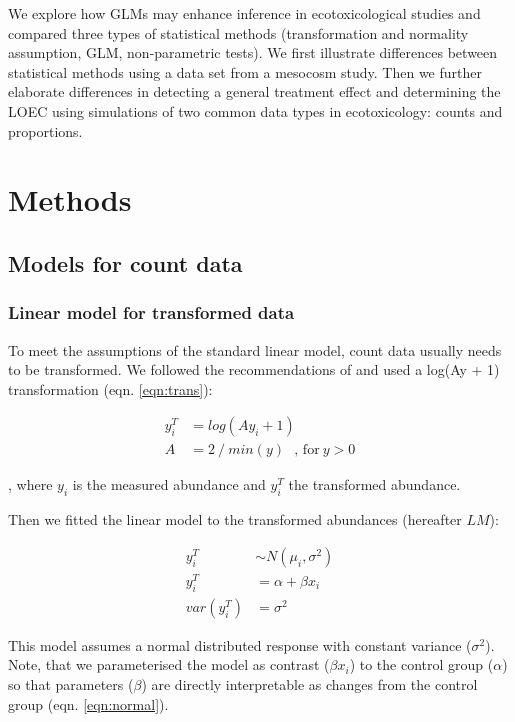 \documentclass{scrartcl}
\begin{document}
We explore how GLMs may enhance inference in ecotoxicological studies and compared three types of statistical methods (transformation and normality assumption, GLM, non-parametric tests).
We first illustrate differences between statistical methods using a data set from a mesocosm study.
Then we further elaborate differences in detecting a general treatment effect and determining the LOEC using simulations of two common data types in ecotoxicology: counts and proportions. 



\section{Methods}
\label{sec:methods}

\subsection{Models for count data}
\subsubsection{Linear model for transformed data}
To meet the assumptions of the standard linear model, count data usually needs to be transformed. 
We followed the recommendations of \citet{van_den_brink_impact_2000} and used a log(Ay + 1) transformation (eqn. \ref{eqn:trans}):

\begin{align}
  y^T_i & = log(Ay_i + 1) \label{eqn:trans} \\
  A & = 2~/~min(y)~~~\text{, for}~ y > 0 \nonumber
\end{align}

, where $y_i$ is the measured abundance and $y_i^T$ the transformed abundance. 

Then we fitted the linear model to the transformed abundances (hereafter $LM$):

\begin{align}
  y_i^T &\sim N(\mu_i, \sigma^2) \nonumber \\
  y_i^T &= \alpha + \beta x_i \label{eqn:normal} \\
  var(y_i^T) &= \sigma^2 \nonumber
\end{align}

This model assumes a normal distributed response with constant variance ($\sigma^2$).
Note, that we parameterised the model as contrast ($\beta x_i$) to the control group ($\alpha$) so that parameters ($\beta$) are directly interpretable as changes from the control group (eqn. \ref{eqn:normal}).
\end{document}
